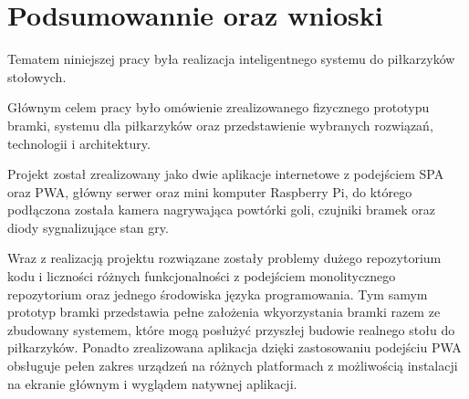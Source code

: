 \chapter{Podsumowannie oraz wnioski}
\label{ch:funplenop}

Tematem niniejszej pracy była realizacja inteligentnego systemu do piłkarzyków stołowych.

Głównym celem pracy było omówienie zrealizowanego fizycznego prototypu bramki, systemu dla piłkarzyków oraz przedstawienie wybranych rozwiązań, technologii i architektury.

Projekt został zrealizowany jako dwie aplikacje internetowe z podejściem SPA oraz PWA, główny serwer oraz mini komputer Raspberry Pi, do którego podłączona została kamera nagrywająca powtórki goli, czujniki bramek oraz diody sygnalizujące stan gry.

Wraz z realizacją projektu rozwiązane zostały problemy dużego repozytorium kodu i liczności różnych funkcjonalności z podejściem monolitycznego repozytorium oraz jednego środowiska języka programowania. Tym samym prototyp bramki przedstawia pełne założenia wkyorzystania bramki razem ze zbudowany systemem, które mogą posłużyć przyszłej budowie realnego stołu do piłkarzyków. Ponadto zrealizowana aplikacja dzięki zastosowaniu podejściu PWA obsługuje pełen zakres urządzeń na różnych platformach z możliwością instalacji na ekranie głównym i wyglądem natywnej aplikacji.